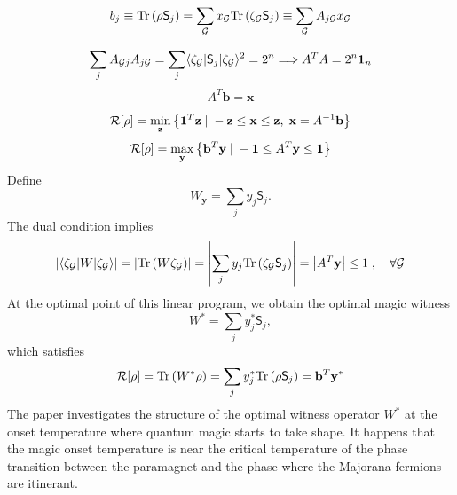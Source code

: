 \[
b_j \equiv
\mathrm{Tr}\left( \rho \mathsf{S}_j \right) 
=
\sum_{\mathcal{G}} x_\mathcal{G} \mathrm{Tr}\left( \zeta_\mathcal{G} \mathsf{S}_j \right)
\equiv 
\sum_{\mathcal{G}} 
A_{j\mathcal{G}} x_\mathcal{G}
\]

\[
\sum_{j} A_{\mathcal{G}j}A_{j\mathcal{G}}
=
\sum_{j} 
\langle \zeta_\mathcal{G} | \mathsf{S}_j | \zeta_\mathcal{G} \rangle^2 = 2^n
\Longrightarrow
A^T A = 2^n\mathbf{1}_n
\]
\[
A^T \mathbf{b} = \mathbf{x}
\]

\[
\mathcal{R}[\rho]
=
\min_{\mathbf{z}}
\left\{ 
\mathbf{1}^T \mathbf{z}
\;|\;
-\mathbf{z} \leq \mathbf{x} \leq \mathbf{z} 
,\;
\mathbf{x} = A^{-1} \mathbf{b}
 \right\}
\]
\[
\mathcal{R}[\rho]
=
\max_{\mathbf{y}}
\left\{ 
\mathbf{b}^T \mathbf{y}
\;|\;
-\mathbf{1} \leq A^T\mathbf{y} \leq \mathbf{1}
 \right\}
\]
Define
\begin{equation}\label{eq:magic-witness}
    W_{\mathbf{y}} = \sum_{j} y_j \mathsf{S}_j.
\end{equation}
The dual condition implies
\[
\left| \langle \zeta_\mathcal{G} | W | \zeta_\mathcal{G} \rangle \right|
=
\left| 
\mathrm{Tr} \left( W\zeta_\mathcal{G} \right) 
 \right|
=
\left| 
    \sum_{j}y_j \mathrm{Tr}\left( \zeta_{\mathcal{G}}\mathsf{S}_j \right)
 \right|
=
\left| A^T\mathbf{y} \right|
\leq 1 \;, \quad
\forall \mathcal{G}
\]
At the optimal point of this linear program, we obtain the optimal magic witness 
\[
W^* = \sum_{j} y^*_j\mathsf{S}_j,
\]
which satisfies 
\[
\mathcal{R}[\rho] = \mathrm{Tr}\left( W^*\rho \right) = \sum_{j}y^*_j\mathrm{Tr}\left( \rho\mathsf{S}_j \right) = \mathbf{b}^T\mathbf{y}^*
\]
The paper \cite{Sabharwal-Shannon-Skrzypczyk_2026} investigates the structure of the optimal witness operator $W^*$ at the onset temperature where quantum magic starts to take shape. It happens that the magic onset temperature is near the critical temperature of the phase transition between the paramagnet and the phase where the Majorana fermions are itinerant.